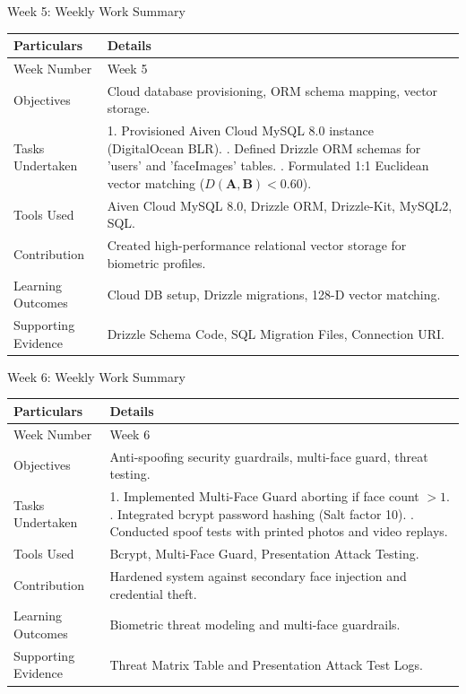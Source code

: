 \documentclass[aspectratio=169, 11pt]{beamer}
\begin{document}
\begin{frame}{Week 5: Weekly Work Summary}
\small
\renewcommand{\arraystretch}{1.2}
\begin{tabular}{|p{3.2cm}|p{8.0cm}|}
\hline
\rowcolor{gray!15} \textbf{Particulars} & \textbf{Details} \\ \hline
Week Number & Week 5 \\ \hline
Objectives & Cloud database provisioning, ORM schema mapping, vector storage. \\ \hline
Tasks Undertaken & 1. Provisioned Aiven Cloud MySQL 8.0 instance (DigitalOcean BLR). \newline 2. Defined Drizzle ORM schemas for 'users' and 'faceImages' tables. \newline 3. Formulated 1:1 Euclidean vector matching ($D(\mathbf{A},\mathbf{B}) < 0.60$). \\ \hline
Tools Used & Aiven Cloud MySQL 8.0, Drizzle ORM, Drizzle-Kit, MySQL2, SQL. \\ \hline
Contribution & Created high-performance relational vector storage for biometric profiles. \\ \hline
Learning Outcomes & Cloud DB setup, Drizzle migrations, 128-D vector matching. \\ \hline
Supporting Evidence & Drizzle Schema Code, SQL Migration Files, Connection URI. \\ \hline
\end{tabular}
\end{frame}

\begin{frame}{Week 6: Weekly Work Summary}
\small
\renewcommand{\arraystretch}{1.2}
\begin{tabular}{|p{3.2cm}|p{8.0cm}|}
\hline
\rowcolor{gray!15} \textbf{Particulars} & \textbf{Details} \\ \hline
Week Number & Week 6 \\ \hline
Objectives & Anti-spoofing security guardrails, multi-face guard, threat testing. \\ \hline
Tasks Undertaken & 1. Implemented Multi-Face Guard aborting if face count $> 1$. \newline 2. Integrated bcrypt password hashing (Salt factor 10). \newline 3. Conducted spoof tests with printed photos and video replays. \\ \hline
Tools Used & Bcrypt, Multi-Face Guard, Presentation Attack Testing. \\ \hline
Contribution & Hardened system against secondary face injection and credential theft. \\ \hline
Learning Outcomes & Biometric threat modeling and multi-face guardrails. \\ \hline
Supporting Evidence & Threat Matrix Table and Presentation Attack Test Logs. \\ \hline
\end{tabular}
\end{frame}
\end{document}
